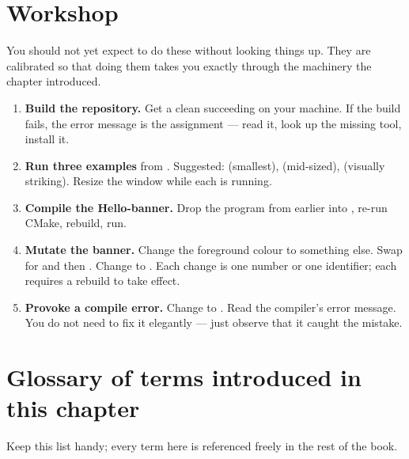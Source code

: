 \section*{Workshop}

You should not yet expect to do these without looking things up. They
are calibrated so that doing them takes you exactly through the
machinery the chapter introduced.

\begin{enumerate}[leftmargin=*]
  \item \textbf{Build the repository.} Get a clean
     succeeding on your
    machine. If the build fails, the error message is the assignment
    --- read it, look up the missing tool, install it.
  \item \textbf{Run three examples} from . Suggested:
     (smallest),  (mid-sized),
     (visually striking). Resize the window while
    each is running.
  \item \textbf{Compile the Hello-banner.} Drop the program from
    earlier into , re-run CMake,
    rebuild, run.
  \item \textbf{Mutate the banner.} Change the foreground colour to
    something else. Swap  for  and then
    . Change  to . Each
    change is one number or one identifier; each requires a rebuild
    to take effect.
  \item \textbf{Provoke a compile error.} Change  to . Read the compiler's error
    message. You do not need to fix it elegantly --- just observe
    that it caught the mistake.
\end{enumerate}

\section*{Glossary of terms introduced in this chapter}

Keep this list handy; every term here is referenced freely in the
rest of the book.

